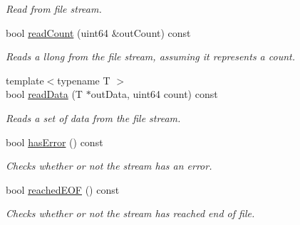 \begin{Indent}
\begin{DoxyCompactItemize}
\begin{DoxyCompactList}\small\item\em Read from file stream. \end{DoxyCompactList}\item 
\mbox{\label{classrev_1_1_file_stream_a0bb933c74bcb8ed33c9ff9f13f6de504}} 
bool \mbox{\hyperlink{classrev_1_1_file_stream_a0bb933c74bcb8ed33c9ff9f13f6de504}{read\+Count}} (uint64 \&out\+Count) const
\begin{DoxyCompactList}\small\item\em Reads a llong from the file stream, assuming it represents a count. \end{DoxyCompactList}\item 
\mbox{\label{classrev_1_1_file_stream_a1d862d8c69b2a5f8b33d3d771eb4cf1c}} 
{\footnotesize template$<$typename T $>$ }\\bool \mbox{\hyperlink{classrev_1_1_file_stream_a1d862d8c69b2a5f8b33d3d771eb4cf1c}{read\+Data}} (T $\ast$out\+Data, uint64 count) const
\begin{DoxyCompactList}\small\item\em Reads a set of data from the file stream. \end{DoxyCompactList}\item 
\mbox{\label{classrev_1_1_file_stream_ae70abc0e36a176e041481a6902c0823e}} 
bool \mbox{\hyperlink{classrev_1_1_file_stream_ae70abc0e36a176e041481a6902c0823e}{has\+Error}} () const
\begin{DoxyCompactList}\small\item\em Checks whether or not the stream has an error. \end{DoxyCompactList}\item 
\mbox{\label{classrev_1_1_file_stream_a1e337153ff7f63da1e15c437e7c7acbd}} 
bool \mbox{\hyperlink{classrev_1_1_file_stream_a1e337153ff7f63da1e15c437e7c7acbd}{reached\+E\+OF}} () const
\begin{DoxyCompactList}\small\item\em Checks whether or not the stream has reached end of file. \end{DoxyCompactList}\end{DoxyCompactItemize}
\end{Indent}
